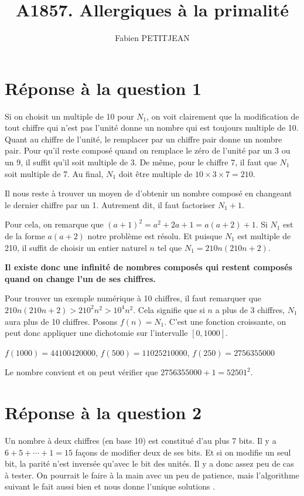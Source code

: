 \documentclass[a4paper,10pt,twocolumn]{article}
\title{A1857. Allergiques à la primalité}
\author{Fabien PETITJEAN}
\date{\begin{enumerate}
\item Trouver un nombre entier composé $N_1$ de dix chiffres  qui reste composé quand on change l'un quelconque de ses dix chiffres par un autre chiffre. Montrer qu'il existe une infinité de nombres entiers composés qui ont la même propriété que $N_1$.
\item Trouver le nombre entier composé $N_2$ à deux chiffres en représentation décimale qui  reste composé quand on change un ou deux chiffres de sa représentation binaire. Il est permis de changer en 0 le ou les chiffre(s) le(s) plus significatif(s).
\end{enumerate}
}
\begin{document}
\maketitle

\section{Réponse à la question 1}

Si on choisit un multiple de 10 pour $N_1$, on voit clairement que la modification de tout chiffre qui n'est pas l'unité donne un nombre qui est toujours multiple de 10.
Quant au chiffre de l'unité, le remplacer par un chiffre pair donne un nombre pair. Pour qu'il reste composé quand on remplace le zéro de l'unité par un 3 ou un 9, il suffit qu'il soit multiple de 3. De même, pour le chiffre 7, il faut que $N_1$ soit multiple de 7. Au final, $N_1$ doit être multiple de 
$10 \times 3 \times 7 = 210$.

Il nous reste à trouver un moyen de d'obtenir un nombre composé en changeant le dernier chiffre par un 1. Autrement dit, il faut factoriser $N_1 + 1$.

Pour cela, on remarque que $(a+1)^2 = a^2 + 2a + 1 = a(a + 2) + 1$. Si $N_1$ est de la forme $a(a+2)$ notre problème est résolu. Et puisque $N_1$ est multiple de 210, il suffit de choisir un entier naturel $n$ tel que $N_1 = 210 n(210 n + 2)$.

{\bf Il existe donc une infinité de nombres composés qui restent composés quand on change l'un de ses chiffres.}

Pour trouver un exemple numérique à 10 chiffres, il faut remarquer que 
$210 n(210n+2) > 210^2 n^2 > 10^4 n^2$.
Cela signifie que si $n$ a plus de 3 chiffres, $N_1$ aura plus de 10 chiffres.
Posons $f(n) = N_1$. C'est une fonction croissante, on peut donc appliquer une dichotomie sur l'intervalle $[0, 1000]$.


$f(1000)=44100420000$, 
$f(500)=11025210000$, 
$f(250)=2756355000$


Le nombre  convient et on peut vérifier que $2756355000 + 1 = 52501^2$.


\section{Réponse à la question 2}

Un nombre à deux chiffres (en base 10) est constitué d'au plus 7 bits. Il y a $6 + 5 + \cdots + 1 = 15$ façons de modifier deux de ses bits. Et si on modifie un seul bit, la parité n'est inversée qu'avec le bit des unités. Il y a donc assez peu de cas à tester. On pourrait le faire à la main avec un peu de patience, mais l'algorithme suivant le fait aussi bien et nous donne l'unique solutions .
\end{document}

